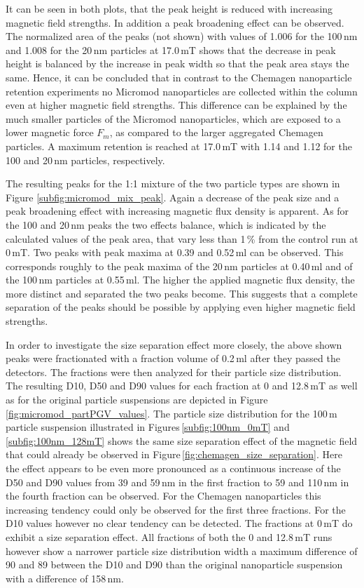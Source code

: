 It can be seen in both plots, that the peak height is reduced with increasing magnetic field strengths. In addition a peak broadening effect can be observed. The normalized area of the peaks (not shown) with values of 1.006 for the 100\,nm and 1.008 for the 20\,nm particles at 17.0\,mT shows that the decrease in peak height is balanced by the increase in peak width so that the peak area stays the same. Hence, it can be concluded that in contrast to the Chemagen nanoparticle retention experiments no Micromod nanoparticles are collected within the column even at higher magnetic field strengths. This difference can be explained by the much smaller particles of the Micromod nanoparticles, which are exposed to a lower magnetic force $F_{m}$, as compared to the larger aggregated Chemagen particles. A maximum retention is reached at 17.0\,mT with 1.14 and 1.12 for the 100 and 20\,nm particles, respectively.

The resulting peaks for the 1:1 mixture of the two particle types are shown in Figure \ref{subfig:micromod_mix_peak}. Again a decrease of the peak size and a peak broadening effect with increasing magnetic flux density is apparent. As for the 100 and 20\,nm peaks the two effects balance, which is indicated by the calculated values of the peak area, that vary less than 1\,\% from the control run at 0\,mT. Two peaks with peak maxima at 0.39 and 0.52\,ml can be observed. This corresponds roughly to the peak maxima of the 20\,nm particles at 0.40\,ml and of the 100\,nm particles at 0.55\,ml. The higher the applied magnetic flux density, the more distinct and separated the two peaks become. This suggests that a complete separation of the peaks should be possible by applying even higher magnetic field strengths.
     
In order to investigate the size separation effect more closely, the above shown peaks were fractionated with a fraction volume of 0.2\,ml after they passed the detectors. The fractions were then analyzed for their particle size distribution.  The resulting D10, D50 and D90 values for each fraction at 0 and 12.8\,mT as well as for the original particle suspensions are depicted in Figure\,\ref{fig:micromod_partPGV_values}. The particle size distribution for the 100\,m particle suspension illustrated in Figures\,\ref{subfig:100nm_0mT} and \ref{subfig:100nm_128mT} shows the same size separation effect of the magnetic field that could already be observed in Figure\,\ref{fig:chemagen_size_separation}. Here the effect appears to be even more pronounced as a continuous increase of the D50 and D90 values from 39 and 59\,nm in the first fraction to 59 and 110\,nm in the fourth fraction can be observed. For the Chemagen nanoparticles this increasing tendency could only be observed for the first three fractions. For the D10 values however no clear tendency can be detected. The fractions at 0\,mT do exhibit a size separation effect. All fractions of both the 0 and 12.8\,mT runs however show a narrower particle size distribution width a maximum difference of 90 and 89 between the D10 and D90 than the original nanoparticle suspension with a difference of 158\,nm.

